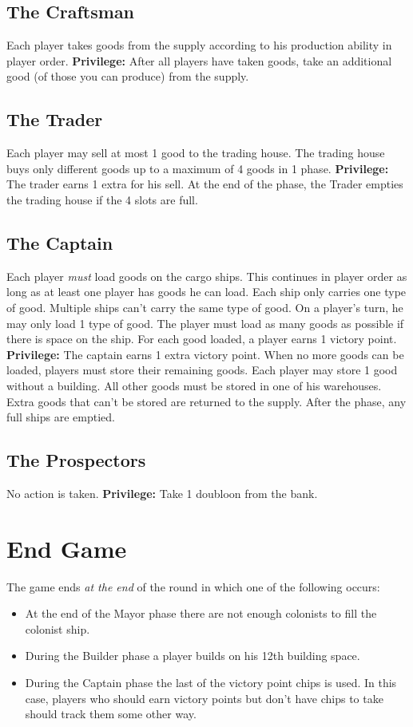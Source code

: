 \documentclass[12pt]{article}
\newenvironment{itemizeCustom}
{\begin{itemize}
  \setlength{\itemsep}{1pt}
  \setlength{\parskip}{0pt}
  \setlength{\parsep}{0pt}}
{\end{itemize}}
\begin{document}
\begin{multicols*}{2}
\subsection*{The Craftsman}
Each player takes goods from the supply according to his production ability in player order. \textbf{Privilege:} After all players have taken goods, take an additional good (of those you can produce) from the supply.

\subsection*{The Trader}
Each player may sell at most 1 good to the trading house. The trading house buys only different goods up to a maximum of 4 goods in 1 phase. \textbf{Privilege:} The trader earns 1 extra for his sell. At the end of the phase, the Trader empties the trading house if the 4 slots are full.

\subsection*{The Captain}
Each player \emph{must} load goods on the cargo ships. This continues in player order as long as at least one player has goods he can load. Each ship only carries one type of good. Multiple ships can't carry the same type of good. On a player's turn, he may only load 1 type of good. The player must load as many goods as possible if there is space on the ship. For each good loaded, a player earns 1 victory point. \textbf{Privilege:} The captain earns 1 extra victory point. When no more goods can be loaded, players must store their remaining goods. Each player may store 1 good without a building. All other goods must be stored in one of his warehouses. Extra goods that can't be stored are returned to the supply. After the phase, any full ships are emptied.

\subsection*{The Prospectors}
No action is taken. \textbf{Privilege:} Take 1 doubloon from the bank.

\section*{End Game}
The game ends \emph{at the end} of the round in which one of the following occurs:
\begin{itemizeCustom}
	\item At the end of the Mayor phase there are not enough colonists to fill the colonist ship.
	\item During the Builder phase a player builds on his 12th building space.
	\item During the Captain phase the last of the victory point chips is used. In this case, players who should earn victory points but don't have chips to take should track them some other way.
\end{itemizeCustom}


\end{multicols*}
\end{document}
